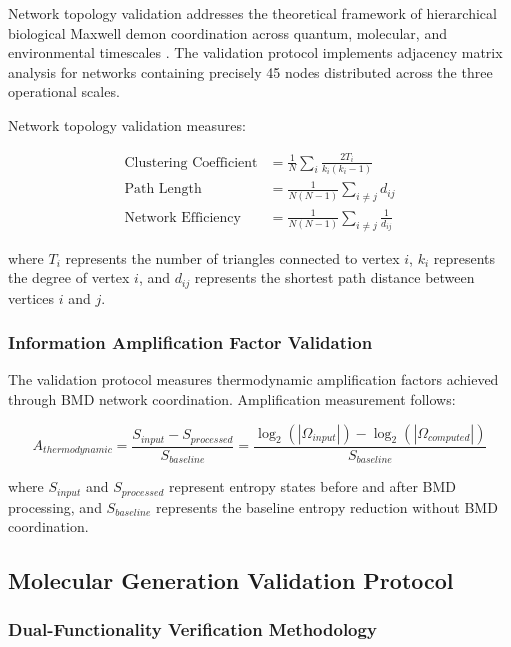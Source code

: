 Network topology validation addresses the theoretical framework of hierarchical biological Maxwell demon coordination across quantum, molecular, and environmental timescales \cite{mizraji2007biological,vedral2011living}. The validation protocol implements adjacency matrix analysis for networks containing precisely 45 nodes distributed across the three operational scales.

Network topology validation measures:

\begin{align}
\text{Clustering Coefficient} &= \frac{1}{N} \sum_i \frac{2T_i}{k_i(k_i-1)} \\
\text{Path Length} &= \frac{1}{N(N-1)} \sum_{i \neq j} d_{ij} \\
\text{Network Efficiency} &= \frac{1}{N(N-1)} \sum_{i \neq j} \frac{1}{d_{ij}}
\end{align}

where $T_i$ represents the number of triangles connected to vertex $i$, $k_i$ represents the degree of vertex $i$, and $d_{ij}$ represents the shortest path distance between vertices $i$ and $j$.

\subsubsection{Information Amplification Factor Validation}

The validation protocol measures thermodynamic amplification factors achieved through BMD network coordination. Amplification measurement follows:

\begin{equation}
A_{thermodynamic} = \frac{S_{input} - S_{processed}}{S_{baseline}} = \frac{\log_2(|\Omega_{input}|) - \log_2(|\Omega_{computed}|)}{S_{baseline}}
\end{equation}

where $S_{input}$ and $S_{processed}$ represent entropy states before and after BMD processing, and $S_{baseline}$ represents the baseline entropy reduction without BMD coordination.

\subsection{Molecular Generation Validation Protocol}

\subsubsection{Dual-Functionality Verification Methodology}

